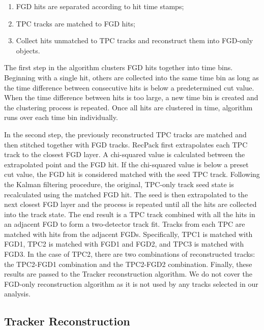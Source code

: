 \begin{enumerate}
\item FGD hits are separated according to hit time stamps;
\item TPC tracks are matched to FGD hits;
\item Collect hits unmatched to TPC tracks and reconstruct them into FGD-only objects.
\end{enumerate}

The first step in the algorithm clusters FGD hits together into time bins. Beginning with a single hit, others are collected into the same time bin as long as the time difference between consecutive hits is below a predetermined cut value. When the time difference between hits is too large, a new time bin is created and the clustering process is repeated. Once all hits are clustered in time, algorithm runs over each time bin individually.

In the second step, the previously reconstructed TPC tracks are matched and then stitched together with FGD tracks. RecPack first  extrapolates each TPC track to the closest FGD layer. A chi-squared value is calculated between the extrapolated point and the FGD hit. If the chi-squared value is below a preset cut value, the FGD hit is considered matched with the seed TPC track. Following the Kalman filtering procedure, the original, TPC-only track seed state is recalculated using the matched FGD hit. The seed is then extrapolated to the next closest FGD layer and the process is repeated until all the hits are collected into the track state. The end result is a TPC track combined with all the hits in an adjacent FGD to form a two-detector track fit. Tracks from each TPC are matched with hits from the adjacent FGDs. Specifically, TPC1 is matched with FGD1, TPC2 is matched with FGD1 and FGD2, and TPC3 is matched with FGD3. In the case of TPC2, there are two combinations of reconstructed tracks: the TPC2-FGD1 combination and the TPC2-FGD2 combination. Finally, these results are passed to the Tracker reconstruction algorithm. We do not cover the FGD-only reconstruction algorithm as it is not used by any tracks selected in our analysis.

\subsection{Tracker Reconstruction}
\label{sec:trackerrecon}

